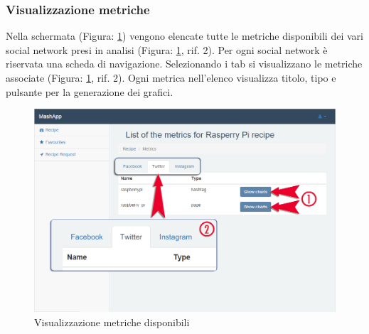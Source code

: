 		\subsubsection{Visualizzazione metriche} %
		\label{sec:visualizzazione_metriche}
			Nella schermata (Figura: \ref{fig:visualizzazione_metriche}) vengono elencate tutte le metriche\gloss{} disponibili dei vari social network\gloss{} presi in analisi (Figura: \ref{fig:visualizzazione_metriche}, rif. 2).\newline
			Per ogni social network\gloss{} è riservata una scheda di navigazione. Selezionando i tab si visualizzano le metriche\gloss{} associate (Figura: \ref{fig:visualizzazione_metriche}, rif. 2).\newline
			Ogni metrica\gloss{} nell'elenco visualizza titolo, tipo e pulsante per la generazione dei grafici.
			\begin{figure}[H]
				\centering
				\centerline{\includegraphics[width=14cm]{images/visualizzazione_metriche.png}}
				\caption{Visualizzazione metriche disponibili}
				\label{fig:visualizzazione_metriche}
			\end{figure}


